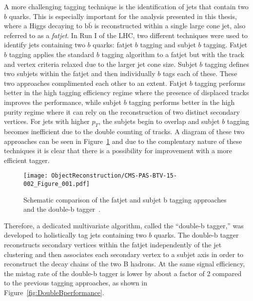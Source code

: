 A more challenging tagging technique is the identification of jets that contain two $b$ quarks. This is especially important for the analysis presented in this thesis, where a Higgs decaying to $\mathrm{b\bar{b}}$ is reconstructed within a single large cone jet, also referred to as a \textit{fatjet}. In Run I of the LHC, two different techniques were used to identify jets containing two $b$ quarks: fatjet $b$ tagging and subjet $b$ tagging. Fatjet $b$ tagging applies the standard $b$ tagging algorithm to a fatjet but with the track and vertex criteria relaxed due to the larger jet cone size. Subjet $b$ tagging defines two subjets within the fatjet and then individually $b$ tags each of these. These two approaches complimented each other to an extent. Fatjet $b$ tagging performs better in the high tagging efficiency regime where the presence of displaced tracks improves the performance, while subjet $b$ tagging performs better in the high purity regime where it can rely on the reconstruction of two distinct secondary vertices. For jets with higher $p_{T}$, the subjets begin to overlap and subjet $b$ tagging becomes inefficient due to the double counting of tracks. A diagram of these two approaches can be seen in Figure~\ref{fig:2btagging} and due to the complentary nature of these techniques it is clear that there is a possibility for improvement with a more efficient tagger. 

\begin{figure}[h!]
\begin{center}
\texttt{[image: ObjectReconstruction/CMS-PAS-BTV-15-002\_Figure\_001.pdf]}
\end{center}
\caption{Schematic comparison of the fatjet and subjet b tagging approaches and the double-b tagger~\cite{DoubleB}.}
\label{fig:2btagging}
\end{figure}

Therefore, a dedicated multivariate algorithm, called the ``double-b tagger,'' was developed to holistically tag jets containing two $b$ quarks. The double-b tagger reconstructs secondary vertices within the fatjet independently of the jet clustering and then associates each secondary vertex to a subjet axis in order to reconstruct the decay chains of the two B hadrons. At the same signal efficiency, the mistag rate of the double-b tagger is lower by about a factor of 2 compared to the previous tagging approaches, as shown in Figure~\ref{fig:DoubleBperformance}. 

